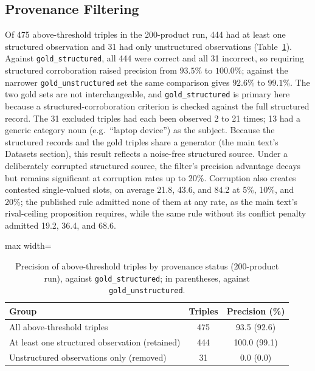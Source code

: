 \documentclass[11pt]{article}
\begin{document}
\subsection{Provenance Filtering}
\label{sec:results-provenance}

Of 475 above-threshold triples in the 200-product run, 444 had at
least one structured observation and 31 had only unstructured
observations (Table~\ref{tab:provenance}). Against
\texttt{gold\_structured}, all 444 were correct and all 31 incorrect, so
requiring structured corroboration raised precision from $93.5\%$ to
$100.0\%$; against the narrower \texttt{gold\_unstructured} set the same
comparison gives $92.6\%$ to $99.1\%$. The two gold sets are not
interchangeable, and \texttt{gold\_structured} is primary here because a
structured-corroboration criterion is checked against the full
structured record.
The 31 excluded triples had each been observed 2 to 21 times; 13 had a
generic category noun (e.g.\ ``laptop device'') as the subject. Because
the structured records and the gold triples share a generator
(the main text's Datasets section), this result reflects a noise-free
structured source. Under a deliberately corrupted structured source,
the filter's precision advantage decays but remains
significant at corruption rates up to 20\%. Corruption also creates
contested single-valued slots, on average 21.8, 43.6, and 84.2 at 5\%,
10\%, and 20\%; the published rule admitted none of them at any rate, as
the main text's rival-ceiling proposition requires, while the same rule without its
conflict penalty admitted 19.2, 36.4, and 68.6.

\begin{table}[htbp]
\centering
\caption{Precision of above-threshold triples by provenance status
(200-product run), against \texttt{gold\_structured}; in parentheses,
against \texttt{gold\_unstructured}.}
\label{tab:provenance}
\begin{adjustbox}{max width=\textwidth}
\begin{tabular}{@{}lcc@{}}
\toprule
Group & Triples & Precision (\%) \\
\midrule
All above-threshold triples & 475 & 93.5 (92.6) \\
At least one structured observation (retained) & 444 & 100.0 (99.1) \\
Unstructured observations only (removed) & 31 & 0.0 (0.0) \\
\bottomrule
\end{tabular}
\end{adjustbox}
\end{table}
\end{document}

